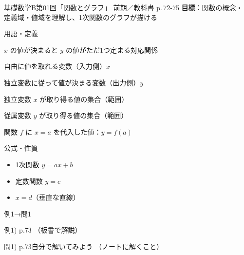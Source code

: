 \documentclass[aspectratio=43,professionalfonts,handout]{beamer}
\newcommand{\LectureNum}{01}
\newcommand{\LectureTitle}{関数とグラフ}
\newcommand{\TextPages}{p.\,72-75}
\newcommand{\CourseName}{基礎数学B}
\renewcommand{\TermName}{前期}
\begin{document}
\begin{frame}{\CourseName\quad 第\LectureNum 回「\LectureTitle 」}
  {\small \TermName\quad \TeacherName\quad ／\quad 教科書 \TextPages\quad
  \textbf{目標}：関数の概念・定義域・値域を理解し、1次関数のグラフが描ける}

  \begin{block}{用語・定義}
  \begin{description}[labelwidth=5.5em]
    \item[\kw{関数}] $x$ の値が決まると $y$ の値がただ1つ定まる対応関係
    \item[\kw{独立変数}] 自由に値を取れる変数（入力側）$x$
    \item[\kw{従属変数}] 独立変数に従って値が決まる変数（出力側）$y$
    \item[\kw{定義域}] 独立変数 $x$ が取り得る値の集合（範囲）
    \item[\kw{値域}] 従属変数 $y$ が取り得る値の集合（範囲）
    \item[\kw{f(a)}] 関数 $f$ に $x=a$ を代入した値：$y=f(a)$
  \end{description}
  \end{block}
\end{frame}

\begin{frame}{公式・性質}
  \begin{block}{}
  \begin{itemize}
    \item 1次関数 $y=ax+b$
    \item 定数関数 $y=c$
    \item $x=d$（垂直な直線）
  \end{itemize}
  \end{block}
\end{frame}

\begin{frame}{例1→問1}
  \begin{exampleblock}{例1) p.73}
    （板書で解説）
  \end{exampleblock}

  \vfill

  \begin{block}{問1) p.73\quad 自分で解いてみよう}
    （ノートに解くこと）
  \end{block}
\end{frame}
\end{document}
